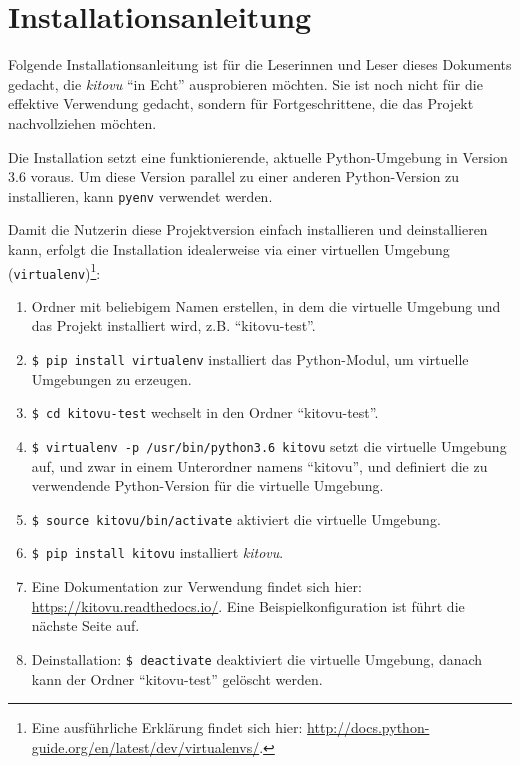 \documentclass[a4paper]{article}
\let\oldsection\section
\renewcommand\section{\clearpage\oldsection}
\begin{document}
\section{Installationsanleitung}

Folgende Installationsanleitung ist für die Leserinnen und Leser dieses Dokuments gedacht, die \emph{kitovu} ``in Echt'' ausprobieren möchten. Sie ist noch nicht für die effektive Verwendung gedacht, sondern für Fortgeschrittene, die das Projekt nachvollziehen möchten.

Die Installation setzt eine funktionierende, aktuelle Python-Umgebung in Version 3.6 voraus. Um diese Version parallel zu einer anderen Python-Version zu installieren, kann \verb|pyenv| verwendet werden.

Damit die Nutzerin diese Projektversion einfach installieren und deinstallieren kann, erfolgt die Installation idealerweise via einer virtuellen Umgebung (\verb|virtualenv|)\footnote{Eine ausführliche Erklärung findet sich hier: \url{http://docs.python-guide.org/en/latest/dev/virtualenvs/}.}:

\begin{enumerate}
	\item Ordner mit beliebigem Namen erstellen, in dem die virtuelle Umgebung und das Projekt installiert wird, z.B. ``kitovu-test''.
	\item \verb|$ pip install virtualenv| \newline
	installiert das Python-Modul, um virtuelle Umgebungen zu erzeugen.
	\item \verb|$ cd kitovu-test| \newline
	wechselt in den Ordner ``kitovu-test''.
	\item \verb|$ virtualenv -p /usr/bin/python3.6 kitovu| \newline
	setzt die virtuelle Umgebung auf, und zwar in einem Unterordner namens ``kitovu'', und definiert die zu verwendende Python-Version für die virtuelle Umgebung.
	\item \verb|$ source kitovu/bin/activate| \newline
	aktiviert die virtuelle Umgebung.
	\item \verb|$ pip install kitovu| \newline 
	installiert \emph{kitovu}.
	\item Eine Dokumentation zur Verwendung findet sich hier: \url{https://kitovu.readthedocs.io/}. Eine Beispielkonfiguration ist führt die nächste Seite auf.
	\item Deinstallation: \verb|$ deactivate| \newline
	deaktiviert die virtuelle Umgebung, danach kann der Ordner ``kitovu-test'' gelöscht werden.
\end{enumerate}
\end{document}
